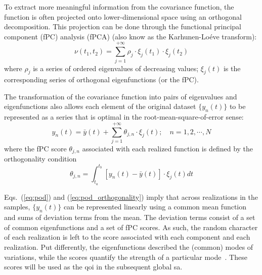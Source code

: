 To extract more meaningful information from the covariance function, the function is often projected onto lower-dimensional space using an orthogonal decomposition.
This projection can be done through the functional principal component (fPC) analysis (fPCA) (also know as the Karhunen-Lo\'eve transform):
\begin{equation}
	\nu (t_1, t_2) = \sum_{j=1}^{+\infty} \rho_j \cdot \xi_j(t_1) \cdot \xi_j(t_2)
\label{eq:kl_transform}
\end{equation}
where $\rho_j$ is a series of ordered eigenvalues of decreasing values; 
$\xi_j(t)$ is the corresponding series of orthogonal eigenfunctions (or the fPC).

The transformation of the covariance function into pairs of eigenvalues and eigenfunctions also allows each element of the original dataset $\{y_n(t)\}$ to be represented as a series that is optimal in the root-mean-square-of-error sense:
\begin{equation}
  y_n(t) = \bar{y}(t) + \sum_{j=1}^{+\infty} \theta_{j,n} \cdot \xi_j (t); \quad n = 1, 2, \cdots, N
\label{eq:pod}
\end{equation}
where the fPC score $\theta_{j,n}$ associated with each realized function is defined by the orthogonality condition
\begin{equation}
  \theta_{j,n} = \int_{t_a}^{t_b} \left[y_n(t) - \bar{y}(t)\right] \cdot \xi_j (t) dt
\label{eq:pod_orthogonality}
\end{equation}

Eqs.~(\ref{eq:pod}) and (\ref{eq:pod_orthogonality}) imply that across realizations in the samples, 
$\{y_n(t)\}$ can be represented linearly using a common mean function and sums of deviation terms from the mean.
The deviation terms consist of a set of common eigenfunctions and a set of fPC scores.
As such, the random character of each realization is left to the score associated with each component and each realization.
Put differently, the eigenfunctions described the (common) modes of variations, 
while the scores quantify the strength of a particular mode~\cite{Wang2012}.
These scores will be used as the \gls{qoi} in the subsequent global \gls{sa}.
